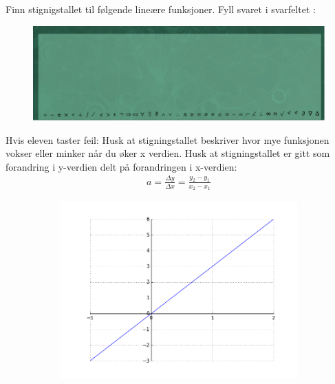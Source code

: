 \documentclass[12pt,twoside,onecolumn]{article}
\begin{document}
\begin{Exercise}
Finn stignigstallet til følgende lineære funksjoner. Fyll svaret i svarfeltet :
\begin{figure}[h!]
\centering
\includegraphics[scale = 0.3]{figures/Svarfelt.png}
\label{fig:grid}
\end{figure}
{\color{Maroon}Hvis eleven taster feil:} Husk at stigningstallet beskriver hvor mye funksjonen vokser eller minker når du øker x verdien. Husk at stigningstallet er gitt som forandring i y-verdien delt på forandringen i x-verdien:
\begin{align}
a = \frac{\Delta y}{\Delta x} = \frac{y_2 - y_1}{x_2 - x_1}
\end{align}
\begin{figure}[h!]
\centering
    \begin{subfigure}{.5\textwidth}
    \centering
    \includegraphics[scale = 0.5]{figures/3X.png}
    \end{subfigure}%
    \begin{subfigure}{.5\textwidth}
    \centering

\end{subfigure}
\end{figure}
\end{Exercise}
\end{document}
